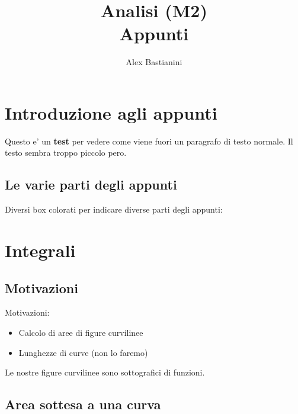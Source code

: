 \documentclass{report}
\title{\Huge{Analisi (M2)}\\Appunti}
\author{\huge{Alex Bastianini}}
\date{}
\begin{document}
\maketitle
\newpage%
\tableofcontents
\pagebreak

\chapter{Introduzione agli appunti}
Questo e' un \textbf{test} per vedere come viene fuori un paragrafo di testo normale. Il testo sembra troppo piccolo pero.
\section{Le varie parti degli appunti}
Diversi box colorati per indicare diverse parti degli appunti:

\chapter{Integrali}
\section{Motivazioni}
Motivazioni:
\begin{itemize}
\item Calcolo di aree di figure curvilinee
\item Lunghezze di curve (non lo faremo)
\end{itemize}
Le nostre figure curvilinee sono sottografici di funzioni.
\section{Area sottesa a una curva}
\end{document}
